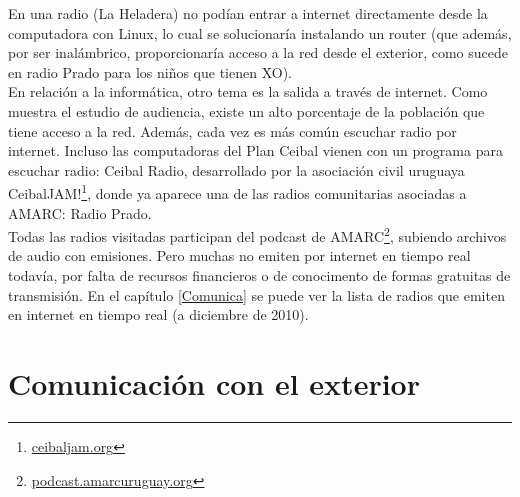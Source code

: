 En una radio (La Heladera) no podían entrar a internet directamente desde la computadora con Linux, lo cual se solucionaría instalando un router (que además, por ser inalámbrico, proporcionaría acceso a la red desde el exterior, como sucede en radio Prado para los niños que tienen XO).\\

En relación a la informática, otro tema es la salida a través de internet. Como muestra el estudio de audiencia, existe un alto porcentaje de la población que tiene acceso a la red. Además, cada vez es más común escuchar radio por internet. Incluso las computadoras del Plan Ceibal vienen con un programa para escuchar radio: Ceibal Radio, desarrollado por la asociación civil uruguaya CeibalJAM!\footnote{\href{http://ceibaljam.org}{ceibaljam.org}}, donde ya aparece una de las radios comunitarias asociadas a AMARC: Radio Prado.\\

Todas las radios visitadas participan del podcast de AMARC\footnote{\href{http://podcast.amarcuruguay.org}{podcast.amarcuruguay.org}}, subiendo archivos de audio con emisiones. Pero muchas no emiten por internet en tiempo real todavía, por falta de recursos financieros o de conocimento de formas gratuitas de transmisión. En el capítulo \ref{Comunica} se puede ver la lista de radios que emiten en internet en tiempo real (a diciembre de 2010).\\
% 
% 

\section{Comunicación con el exterior}

